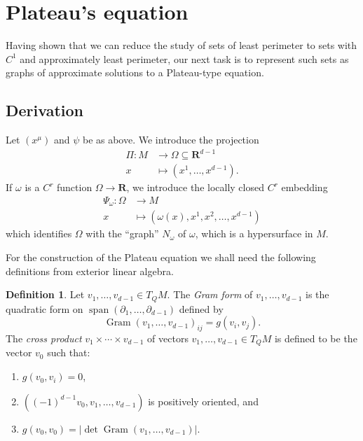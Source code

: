 \documentclass[reqno,12pt,letterpaper]{amsart}
\newcommand{\RR}{\mathbf{R}}
\DeclareMathOperator{\Gram}{Gram}
\DeclareMathOperator{\spn}{span}
\newcommand{\dfn}[1]{\emph{#1}\index{#1}}
\theoremstyle{definition}
\newtheorem{definition}[theorem]{Definition}
\numberwithin{equation}{section}
\begin{document}
\section{Plateau's equation}\label{DeGiorgiSection}
Having shown that we can reduce the study of sets of least perimeter to sets with $C^1$ and approximately least perimeter, our next task is to represent such sets as graphs of approximate solutions to a Plateau-type equation.

\subsection{Derivation}
Let $(x^\mu)$ and $\psi$ be as above. We introduce the projection
\begin{align*}
    \Pi: M &\to \Omega \subseteq \RR^{d - 1}\\
    x &\mapsto (x^1, \dots, x^{d - 1}).
\end{align*}
If $\omega$ is a $C^r$ function $\Omega \to \RR$, we introduce the locally closed $C^r$ embedding
\begin{align*}
    \Psi_\omega: \Omega &\to M \\
    x &\mapsto (\omega(x), x^1, x^2, \dots, x^{d - 1})
\end{align*}
which identifies $\Omega$ with the ``graph'' $N_\omega$ of $\omega$, which is a hypersurface in $M$.

For the construction of the Plateau equation we shall need the following definitions from exterior linear algebra.

\begin{definition}
Let $v_1, \dots, v_{d - 1} \in T_QM$.
The \dfn{Gram form} of $v_1, \dots, v_{d - 1}$ is the quadratic form on $\spn(\partial_1, \dots, \partial_{d - 1})$ defined by
$$\Gram(v_1, \dots, v_{d - 1})_{ij} = g(v_i, v_j).$$
The \dfn{cross product} $v_1 \times \cdots \times v_{d - 1}$ of vectors $v_1, \dots, v_{d - 1} \in T_QM$ is defined to be the vector $v_0$
such that:
\begin{enumerate}
\item $g(v_0, v_i) = 0$,
\item $((-1)^{d - 1} v_0, v_1, \dots, v_{d - 1})$ is positively oriented, and
\item $g(v_0, v_0) = |\det \Gram(v_1, \dots, v_{d - 1})|$.
\end{enumerate}
\end{definition}
\end{document}
